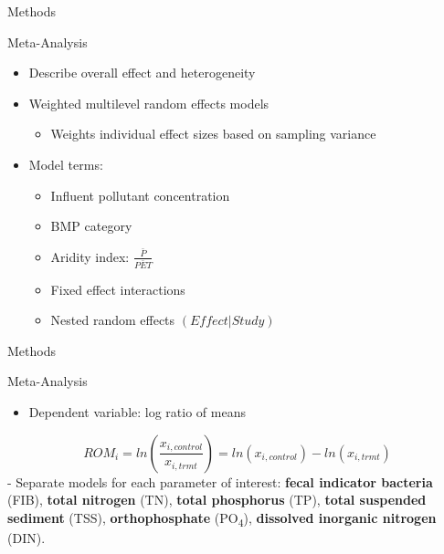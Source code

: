 \documentclass[
  ignorenonframetext,
  aspectratio=169,
]{beamer}
\providecommand{\tightlist}{%
  \setlength{\itemsep}{0pt}\setlength{\parskip}{0pt}}\usepackage{longtable,booktabs,array}
\begin{document}
\begin{frame}{Methods}
\label{methods-2}
\begin{block}{Meta-Analysis}
\label{meta-analysis}
\begin{itemize}
\tightlist
\item
  Describe overall effect and heterogeneity
\item
  Weighted multilevel random effects models

  \begin{itemize}
  \tightlist
  \item
    Weights individual effect sizes based on sampling variance
  \end{itemize}
\item
  Model terms:

  \begin{itemize}
  \tightlist
  \item
    Influent pollutant concentration
  \item
    BMP category
  \item
    Aridity index: \(\frac{\bar{P}}{\bar{PET}}\)
  \item
    Fixed effect interactions
  \item
    Nested random effects \((Effect|Study)\)
  \end{itemize}
\end{itemize}
\end{block}
\end{frame}

\begin{frame}{Methods}
\label{methods-3}
\begin{block}{Meta-Analysis}
\label{meta-analysis-1}
\begin{itemize}
\tightlist
\item
  Dependent variable: log ratio of means
\end{itemize}

\[
ROM_i = ln(\frac{x_{i,control}}{x_{i,trmt}}) = ln(x_{i,control}) - ln(x_{i,trmt})
\] - Separate models for each parameter of interest: \textbf{fecal
indicator bacteria} (FIB), \textbf{total nitrogen} (TN), \textbf{total
phosphorus} (TP), \textbf{total suspended sediment} (TSS),
\textbf{orthophosphate} (PO\textsubscript{4}), \textbf{dissolved
inorganic nitrogen} (DIN).
\end{block}
\end{frame}
\end{document}
